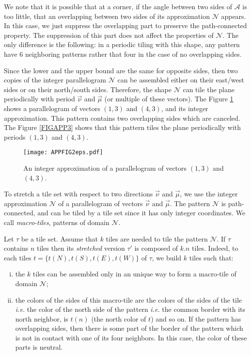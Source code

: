 \documentclass{llncs}
\makeatletter
\newcommand{\ie}{\emph{i.e.}\@\xspace}
\newcommand{\nn}{\vec\nu}
\newcommand{\mm}{\vec \mu}
\makeatother
\begin{document}
We note that it is possible
that at a corner, if the angle between two sides of $\mathcal{A}$ is too little, that an overlapping
between two sides of its approximation $\mathcal{N}$ appears. In this case, we just suppress the overlapping
part to preserve the path-connected property. The suppression of this part does not affect the properties
of $\mathcal{N}$. The only difference is the following: in a periodic tiling with this shape, any pattern
have $6$ neighboring patterns rather that four in the case of no overlapping sides.

 Since the lower and the
upper bound are the same for opposite sides, then two copies of the integer parallelogram $\mathcal{N}$ can be
assembled either on their east/west sides or on their north/south sides. Therefore, the shape $\mathcal{N}$ can
tile the plane periodically with period $\nn$ and $\mm$ (or multiple of these vectors).
The Figure \ref{FIGAPP2} shows a parallelogram of vectors $(1,3)$ and $(4,3)$, and its
integer approximation. This pattern contains two overlapping sides which are canceled. The Figure \ref{FIGAPP3}
shows that this pattern tiles the plane periodically with periods $(1,3)$ and $(4,3)$.

\begin{figure}
\begin{center}
\texttt{[image: APPFIG2eps.pdf]}
\end{center}
\caption{An integer approximation of a parallelogram of vectors $(1,3)$ and $(4,3)$.}
\label{FIGAPP2}
\end{figure}

To stretch a tile set with respect to two directions $\nn$ and $\mm$, we use the integer approximation $\mathcal{N}$
of a parallelogram of vectors $\nn$ and $\mm$. The pattern $\mathcal{N}$ is path-connected, and can be tiled by
a tile set since it has only integer coordinates. We call {\em macro-tiles}, patterns of domain  $\mathcal{N}$.

Let $\tau$ be a tile set. Assume that $k$ tiles are needed to tile the pattern
$\mathcal{N}$. If $\tau$ contains $n$ tiles then its {\em stretched} version $\tau'$
is composed of $k.n$ tiles. Indeed, to each tiles $t=\{t(N),t(S),t(E),t(W)\}$ of $\tau$, we build $k$ tiles such that:

\begin{enumerate}[i)]
\item the $k$ tiles can be assembled only in an unique way to form a macro-tile of domain $\mathcal{N}$;
\item the colors of the sides of this macro-tile are the colors of the sides of the tile \ie the color
of the north side of the pattern \ie the common border with its north neighbor,
is $t(n)$ (the north color of $t$) and so on. If the pattern has overlapping sides, then there is some part of the border of the pattern
which is not in contact with one of its four neighbors. In this case, the color of these parts is neutral.

\end{enumerate}
\end{document}
